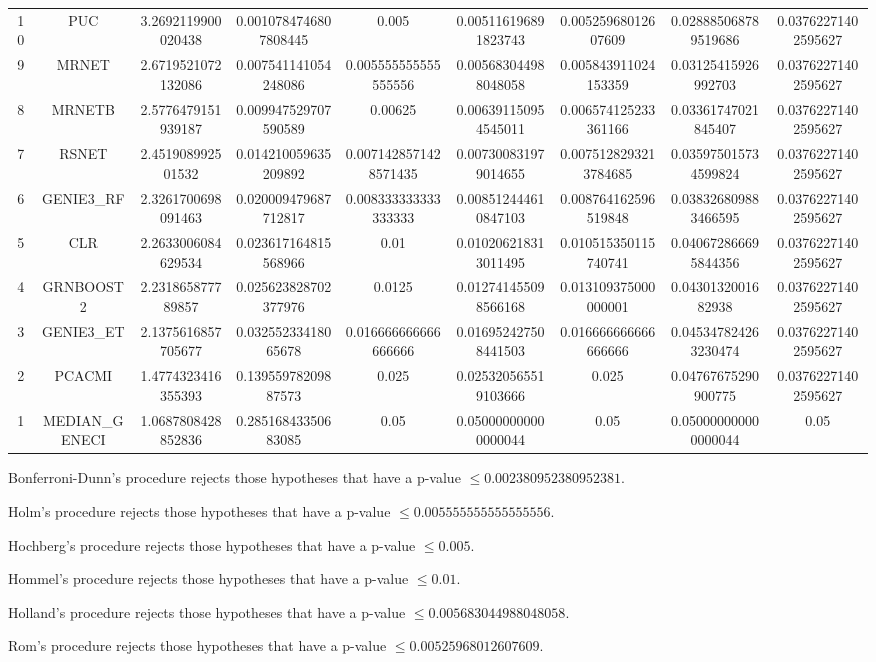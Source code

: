 \documentclass[a4paper,10pt]{article}
\begin{document}
\begin{landscape}
\begin{table}[!htp]
\begin{tabular}{ccccccccc}
10&PUC&3.2692119900020438&0.0010784746807808445&0.005&0.005116196891823743&0.00525968012607609&0.028885068789519686&0.03762271402595627\\
9&MRNET&2.6719521072132086&0.007541141054248086&0.005555555555555556&0.005683044988048058&0.005843911024153359&0.03125415926992703&0.03762271402595627\\
8&MRNETB&2.5776479151939187&0.009947529707590589&0.00625&0.006391150954545011&0.006574125233361166&0.03361747021845407&0.03762271402595627\\
7&RSNET&2.451908992501532&0.014210059635209892&0.0071428571428571435&0.007300831979014655&0.0075128293213784685&0.035975015734599824&0.03762271402595627\\
6&GENIE3_RF&2.3261700698091463&0.020009479687712817&0.008333333333333333&0.008512444610847103&0.008764162596519848&0.038326809883466595&0.03762271402595627\\
5&CLR&2.2633006084629534&0.023617164815568966&0.01&0.010206218313011495&0.010515350115740741&0.040672866695844356&0.03762271402595627\\
4&GRNBOOST2&2.231865877789857&0.025623828702377976&0.0125&0.012741455098566168&0.013109375000000001&0.0430132001682938&0.03762271402595627\\
3&GENIE3_ET&2.1375616857705677&0.03255233418065678&0.016666666666666666&0.016952427508441503&0.016666666666666666&0.045347824263230474&0.03762271402595627\\
2&PCACMI&1.4774323416355393&0.13955978209887573&0.025&0.025320565519103666&0.025&0.04767675290900775&0.03762271402595627\\
1&MEDIAN_GENECI&1.0687808428852836&0.28516843350683085&0.05&0.050000000000000044&0.05&0.050000000000000044&0.05\\
\hline
\end{tabular}
\end{table}
Bonferroni-Dunn's procedure rejects those hypotheses that have a p-value $\le0.002380952380952381$.


Holm's procedure rejects those hypotheses that have a p-value $\le0.005555555555555556$.


Hochberg's procedure rejects those hypotheses that have a p-value $\le0.005$.


Hommel's procedure rejects those hypotheses that have a p-value $\le0.01$.


Holland's procedure rejects those hypotheses that have a p-value $\le0.005683044988048058$.


Rom's procedure rejects those hypotheses that have a p-value $\le0.00525968012607609$.



\end{landscape}
\end{document}
